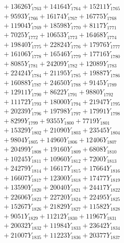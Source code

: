 \documentclass[a4paper,10pt]{article}
\begin{document}
{\begin{align}
&\;  + 13626 Y_{1763} + 14164 Y_{1764} + 15211 Y_{1765} \\[0.3ex]
&\;  + 9593 Y_{1766} + 16174 Y_{1767} + 16775 Y_{1768} \\[0.5ex]\allowbreak
&\;  + 11904 Y_{1769} + 18598 Y_{1770} + 8117 Y_{1771} \\[0.3ex]
&\;  + 7025 Y_{1772} + 10653 Y_{1773} + 16468 Y_{1774} \\[0.3ex]
&\;  + 19840 Y_{1775} + 22824 Y_{1776} + 17976 Y_{1777} \\[0.3ex]
&\;  + 16106 Y_{1778} + 16546 Y_{1779} + 17716 Y_{1780} \\[0.3ex]
&\;  + 8085 Y_{1781} + 24209 Y_{1782} + 12089 Y_{1783} \\[0.3ex]
&\;  + 22424 Y_{1784} + 21195 Y_{1785} + 19887 Y_{1786} \\[0.3ex]
&\;  + 16088 Y_{1787} + 24650 Y_{1788} + 9145 Y_{1789} \\[0.3ex]
&\;  + 12911 Y_{1790} + 8622 Y_{1791} + 9880 Y_{1792} \\[0.3ex]
&\;  + 11172 Y_{1793} + 18000 Y_{1794} + 21947 Y_{1795} \\[0.3ex]
&\;  + 20239 Y_{1796} + 19798 Y_{1797} + 17991 Y_{1798} \\[0.5ex]\allowbreak
&\;  + 8299 Y_{1799} + 9355 Y_{1800} + 7719 Y_{1801} \\[0.3ex]
&\;  + 15329 Y_{1802} + 21090 Y_{1803} + 23545 Y_{1804} \\[0.3ex]
&\;  + 9804 Y_{1805} + 14960 Y_{1806} + 12406 Y_{1807} \\[0.3ex]
&\;  + 20499 Y_{1808} + 19160 Y_{1809} + 6808 Y_{1810} \\[0.3ex]
&\;  + 10245 Y_{1811} + 10960 Y_{1812} + 7200 Y_{1813} \\[0.3ex]
&\;  + 24279 Y_{1814} + 16617 Y_{1815} + 17664 Y_{1816} \\[0.3ex]
&\;  + 16607 Y_{1817} + 12300 Y_{1818} + 17477 Y_{1819} \\[0.3ex]
&\;  + 13590 Y_{1820} + 20040 Y_{1821} + 24417 Y_{1822} \\[0.3ex]
&\;  + 22606 Y_{1823} + 22720 Y_{1824} + 22495 Y_{1825} \\[0.3ex]
&\;  + 15267 Y_{1826} + 21829 Y_{1827} + 11582 Y_{1828} \\[0.5ex]\allowbreak
&\;  + 9051 Y_{1829} + 11212 Y_{1830} + 11967 Y_{1831} \\[0.3ex]
&\;  + 20032 Y_{1832} + 11984 Y_{1833} + 23642 Y_{1834} \\[0.3ex]
&\;  + 21007 Y_{1835} + 11223 Y_{1836} + 20377 Y_{1837} \\[0.3ex]

\end{align}}
\end{document}
